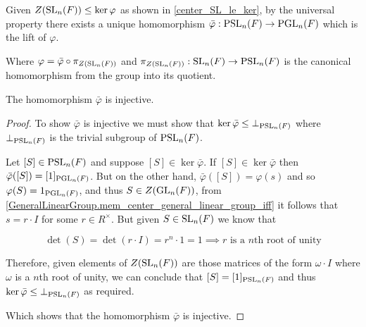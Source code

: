 \begin{definition}
\label{PSL_monoidHom_PGL}
\leanok
    Given $Z(\operatorname{SL}_n(F)) \leq \ker \varphi$ as shown in \ref{center_SL_le_ker}, by the universal property there exists a unique homomorphism $\bar{\varphi} : \operatorname{PSL}_n(F) \rightarrow \operatorname{PGL}_n(F)$ which is the lift of $\varphi$. 
    
    Where $\varphi = \bar{\varphi} \circ \pi_{Z(\operatorname{SL}_n(F))}$ and $\pi_{Z(\operatorname{SL}_n(F))} : \operatorname{SL}_n(F) \rightarrow \operatorname{PSL}_n(F)$ is the canonical homomorphism from the group into its quotient.
\end{definition}



\begin{lemma}
\label{Injective_PSL_monoidHom_PGL}
\leanok
    The homomorphism $\bar{\varphi}$ is injective.
\end{lemma}
\begin{proof}
\leanok

To show $\bar{\varphi}$ is injective we must show that $\ker \bar{\varphi} \leq \bot_{\operatorname{PSL}_n(F)}$ where $\bot_{\operatorname{PSL}_n(F)}$ is the trivial subgroup of $\operatorname{PSL}_n(F)$.

Let $[S] \in \operatorname{PSL}_n(F)$ and suppose $[S] \in \ker \bar{\varphi}$. If $[S] \in \ker \bar{\varphi}$ then $\bar{\varphi} ([S]) = [1]_{\operatorname{PGL}_n(F)}$. But on the other hand, $\bar{\varphi} ([S]) = \varphi(s)$ and so $\varphi(S) = 1_{\operatorname{PGL}_n(F)}$, 
and thus $S \in Z(\operatorname{GL}_n(F))$, from \ref{GeneralLinearGroup.mem_center_general_linear_group_iff} it follows that $s = r \cdot I$ for some $r \in R^\times$. But given $S \in \operatorname{SL}_n(F)$ we know that 

\begin{equation*}
    \det(S) = \det(r \cdot I) = r^n \cdot 1 = 1 \implies \text{$r$ is a $n$th root of unity}
\end{equation*}

Therefore, given elements of $Z(\operatorname{SL}_n(F))$ are those matrices of the form $\omega \cdot I$ where $\omega$ is a $n$th root of unity, we can conclude that $[S] = [1]_{\operatorname{PSL}_n(F)}$ and thus $\ker \bar{\varphi} \leq \bot_{\operatorname{PSL}_n(F)}$ as required.

Which shows that the homomorphism $\bar{\varphi}$ is injective.
\end{proof}
    
